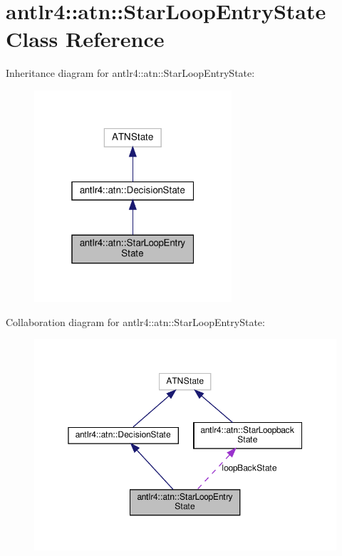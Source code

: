 \hypertarget{classantlr4_1_1atn_1_1StarLoopEntryState}{}\section{antlr4\+:\+:atn\+:\+:Star\+Loop\+Entry\+State Class Reference}
\label{classantlr4_1_1atn_1_1StarLoopEntryState}


Inheritance diagram for antlr4\+:\+:atn\+:\+:Star\+Loop\+Entry\+State\+:
\nopagebreak
\begin{figure}[H]
\begin{center}
\leavevmode
\includegraphics[width=208pt]{classantlr4_1_1atn_1_1StarLoopEntryState__inherit__graph}
\end{center}
\end{figure}


Collaboration diagram for antlr4\+:\+:atn\+:\+:Star\+Loop\+Entry\+State\+:
\nopagebreak
\begin{figure}[H]
\begin{center}
\leavevmode
\includegraphics[width=350pt]{classantlr4_1_1atn_1_1StarLoopEntryState__coll__graph}
\end{center}
\end{figure}
